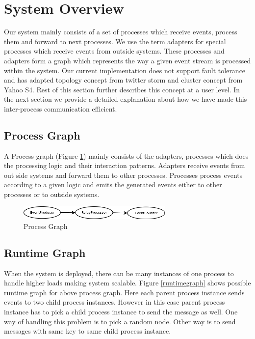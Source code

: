 \section{System Overview}
Our system mainly consists of a set of processes which receive events, process them and forward to next processes. We use the term adapters for special processes which receive events from outside systems. These processes and adapters form a graph which represents the way a given event stream is processed within the system. Our current implementation does not support fault tolerance and has adapted topology concept from twitter storm\cite{twitterStorm} and cluster concept from Yahoo S4\cite{neumeyer2010s4}. Rest of this section further describes this concept at a user level. In the next section we provide a detailed explanation about how we have made this inter-process communication efficient. 
\subsection{Process Graph}
A Process graph (Figure \ref{processgraph}) mainly consists of the adapters, processes which does the processing logic and their interaction patterns. Adapters receive events from out side systems and forward them to other processes. Processes process events according to a given logic and emits the generated events either to other processes or to outside systems. 

\begin{figure}[!t]
	\centering
	\includegraphics[width=3.0in]{processgraph.png}
	\caption{Process Graph}
	\label{processgraph}
\end{figure}

\subsection{Runtime Graph}
When the system is deployed, there can be many instances of one process to handle higher loads making system scalable. Figure \ref{runtimegraph} shows possible runtime graph for above process graph. Here each parent process instance sends events to two child process instances. However in this case parent process instance has to pick a child process instance to send the message as well. One way of handling this problem is to pick a random node. Other way is to send messages with same key to same child process instance. 

